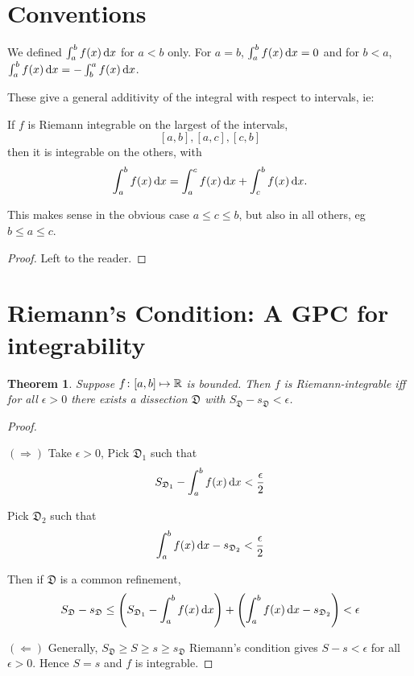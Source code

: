 \documentclass{notes}
\theoremstyle{plain}
\newtheorem{theorem}[proposition]{Theorem}
\newcommand{\dis}{\mathfrak{D}}
\begin{document}
\section*{Conventions}

We defined $ \int_{a}^{b}f(x)\,\mathrm{d} x $ for $ a<b $ only.
For $ a=b $, $ \int_{a}^{b}f(x)\,\mathrm{d} x=0 $ and for $ b<a $, $ 
\int_{a}^{b}f(x)\,\mathrm{d} x= - \int_{b}^{a}f(x)\,\mathrm{d} x $.

These give a general additivity of the integral with respect to 
intervals, ie:

If $ f $ is Riemann integrable on the largest of the intervals, \[ 
[a,b], [a,c], [c,b] \]
then it is integrable on the others, with
\[
\int_{a}^{b}f(x)\,\mathrm{d} x = \int_{a}^{c}f(x)\,\mathrm{d} x + \int_{c}^{b}f(x)\,\mathrm{d}
x.
\]

This makes sense in the obvious case $ a\leq c \leq b $, but also 
in all others, eg $ b \leq a \leq c $.

\begin{proof}
Left to the reader.
\end{proof}

\section{Riemann's Condition: A GPC for integrability}

\begin{theorem}
Suppose  $f\colon [a,b] \mapsto \mathbb{R}$ is bounded. Then $ f $ is 
Riemann-integrable iff for all $ \epsilon >0  $ there exists a
dissection $ \dis $ with $S_{\dis}-s_{\dis}<\epsilon$.
\end{theorem}
\begin{proof}
\

$ (\Rightarrow) $ Take $ \epsilon>0 $, Pick $ \dis_{1} $ such that
\[ S_{\dis_{1}}-\int_{a}^{b}f(x)\,\ud x < \frac{\epsilon}{2} \]

Pick $ \dis_{2} $ such that
\[ \int_{a}^{b}f(x)\,\ud x - s_{\dis_{2}}< \frac{\epsilon}{2} \]

Then if $ \dis $ is a common refinement,
\[ S_{\dis}-s_{\dis} \leq \left(S_{\dis_{1}}-\int_{a}^{b}f(x)\,\ud x 
\right) +
\left(\int_{a}^{b}f(x)\,\ud x-s_{\dis_{2}}\right) < \epsilon \]

$ (\Leftarrow) $ Generally,
$S_{\dis} \geq S \geq s \geq s_{\dis}$
Riemann's condition gives $ S-s<\epsilon $ for all $ 
\epsilon>0 $.
Hence $ S=s $ and $ f $ is integrable.
\end{proof}
\end{document}

